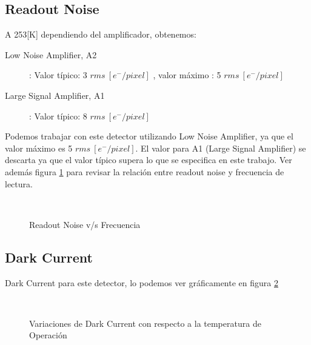\documentclass[a4paper,10pt]{article}
\begin{document}
\subsection{Readout Noise}
A 253[K] dependiendo del amplificador, obtenemos:
\begin{description}
\item [Low Noise Amplifier, A2]: Valor típico: 3 $rms\ [e^-/pixel]$ , valor máximo : 5 $rms\ [e^-/pixel]$
\item [Large Signal Amplifier, A1]: Valor típico: 8 $rms\ [e^-/pixel]$
\end{description}
Podemos trabajar con este detector utilizando Low Noise Amplifier, ya que el
valor máximo es 5 $rms\ [e^-/pixel]$. El valor para A1 (Large Signal Amplifier)
se descarta ya que el valor típico supera lo que se especifica en este trabajo.
Ver además figura \ref{fig:p3_1} para revisar la relación entre readout noise y
frecuencia de lectura.
\begin{figure}[ht!]
  \centering
  ~ 
  \caption{Readout Noise v/s Frecuencia}
  \label{fig:p3_1}
\end{figure}

\subsection{Dark Current}
Dark Current para este detector, lo podemos ver gráficamente en figura \ref{fig:p3}
\begin{figure}[ht!]
  \centering
  ~ 
  \caption{Variaciones de Dark Current con respecto a la temperatura de Operación}
  \label{fig:p3}
\end{figure}
\end{document}
